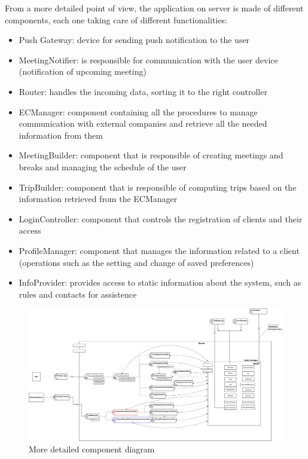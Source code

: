 \documentclass[a4paper,leqno]{article}
\begin{document}
From a more detailed point of view, the application on server is made of different components, each one taking care of different functionalities:
\begin{itemize}
	\item Push Gateway: device for sending push notification to the user
	\item MeetingNotifier: is responsible for communication with the user device (notification of upcoming meeting)
	\item Router: handles the incoming data, sorting it to the right controller
	\item ECManager: component containing all the procedures to manage communication with external companies and retrieve all the needed information from them
	\item MeetingBuilder: component that is responsible of creating meetings and breaks and managing the schedule of the user
	\item TripBuilder: component that is responsible of computing trips based on the information retrieved from the ECManager
	\item LoginController: component that controls the registration of clients and their access 
	\item ProfileManager: component that manages the information related to a client (operations such as the setting and change of saved preferences)
	\item InfoProvider: provides access to static information about the system, such as rules and contacts for assistence
\end{itemize}

\begin{figure}[!h]
	\centering
	\begin{center}
		\includegraphics[scale=0.15, angle = 90]{UMLComponentView_24112017_2}
	\end{center}
	\caption{More detailed component diagram}
\end{figure}
\end{document}
